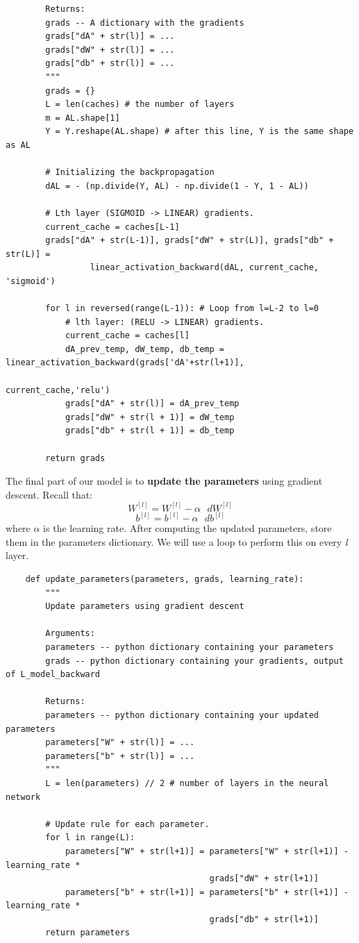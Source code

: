 \documentclass[11pt, a4paper]{article}
\begin{document}
\begin{spacing}{1.1}
\begin{lstlisting}
		Returns:
		grads -- A dictionary with the gradients
		grads["dA" + str(l)] = ... 
		grads["dW" + str(l)] = ...
		grads["db" + str(l)] = ... 
		"""
		grads = {}
		L = len(caches) # the number of layers
		m = AL.shape[1]
		Y = Y.reshape(AL.shape) # after this line, Y is the same shape as AL
		
		# Initializing the backpropagation
		dAL = - (np.divide(Y, AL) - np.divide(1 - Y, 1 - AL))
		
		# Lth layer (SIGMOID -> LINEAR) gradients.
		current_cache = caches[L-1]
		grads["dA" + str(L-1)], grads["dW" + str(L)], grads["db" + str(L)] = 
		         linear_activation_backward(dAL, current_cache, 'sigmoid')
		
		for l in reversed(range(L-1)): # Loop from l=L-2 to l=0
			# lth layer: (RELU -> LINEAR) gradients.
			current_cache = caches[l]
			dA_prev_temp, dW_temp, db_temp = linear_activation_backward(grads['dA'+str(l+1)], 
			                                                            current_cache,'relu')
			grads["dA" + str(l)] = dA_prev_temp
			grads["dW" + str(l + 1)] = dW_temp
			grads["db" + str(l + 1)] = db_temp
		
		return grads \end{lstlisting} \newpage

	\noindent The final part of our model is to \textbf{update the parameters} using gradient descent. Recall that: $$ W^{[l]} = W^{[l]} - \alpha \text{ } dW^{[l]}$$ $$ b^{[l]} = b^{[l]} - \alpha \text{ } db^{[l]}$$ where $\alpha$ is the learning rate. After computing the updated parameters, store them in the parameters dictionary. We will use a loop to perform this on every \textit{l} layer.
	\begin{lstlisting}
	def update_parameters(parameters, grads, learning_rate):
		"""
		Update parameters using gradient descent
		
		Arguments:
		parameters -- python dictionary containing your parameters 
		grads -- python dictionary containing your gradients, output of L_model_backward
		
		Returns:
		parameters -- python dictionary containing your updated parameters 
		parameters["W" + str(l)] = ... 
		parameters["b" + str(l)] = ...
		"""
		L = len(parameters) // 2 # number of layers in the neural network
		
		# Update rule for each parameter.
		for l in range(L):
			parameters["W" + str(l+1)] = parameters["W" + str(l+1)] - learning_rate * 
			                             grads["dW" + str(l+1)]
			parameters["b" + str(l+1)] = parameters["b" + str(l+1)] - learning_rate * 
			                             grads["db" + str(l+1)]
		return parameters \end{lstlisting} \vspace*{8mm}
	

\end{spacing}
\end{document}

